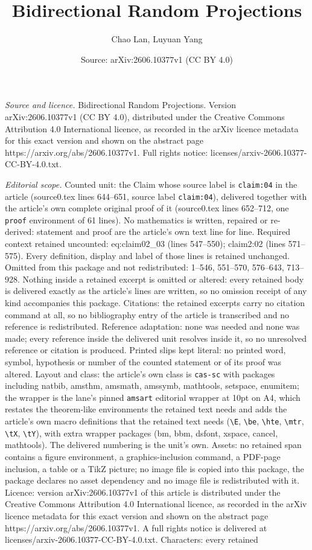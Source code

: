 \documentclass[10pt,a4paper]{amsart}
\title[Bidirectional Random Projections]{Bidirectional Random Projections}
\author{Chao Lan, Luyuan Yang}
\date{Source: arXiv:2606.10377v1 (CC BY 4.0)}
\begin{document}
\maketitle

\noindent\emph{Source and licence.} Bidirectional Random Projections. Version arXiv:2606.10377v1 (CC BY 4.0), distributed under the Creative Commons Attribution 4.0 International licence, as recorded in the arXiv licence metadata for this exact version and shown on the abstract page https://arxiv.org/abs/2606.10377v1. Full rights notice: licenses/arxiv-2606.10377-CC-BY-4.0.txt.\par\smallskip

\noindent\textit{Editorial scope.} Counted unit: the Claim whose source label is \texttt{claim:04} in the article (source0.tex lines 644--651, source label \texttt{claim:04}), delivered together with the article's own complete original proof of it (source0.tex lines 652--712, one \texttt{proof} environment of 61 lines). No mathematics is written, repaired or re-derived: statement and proof are the article's own text line for line. Required context retained uncounted: eq:claim02\_03 (lines 547--550); claim2:02 (lines 571--575). Every definition, display and label of those lines is retained unchanged. Omitted from this package and not redistributed: 1--546, 551--570, 576--643, 713--928. Nothing inside a retained excerpt is omitted or altered: every retained body is delivered exactly as the article's lines are written, so no omission receipt of any kind accompanies this package. Citations: the retained excerpts carry no citation command at all, so no bibliography entry of the article is transcribed and no reference is redistributed. Reference adaptation: none was needed and none was made; every reference inside the delivered unit resolves inside it, so no unresolved reference or citation is produced. Printed slips kept literal: no printed word, symbol, hypothesis or number of the counted statement or of its proof was altered. Layout and class: the article's own class is \texttt{cas-sc} with packages including natbib, amsthm, amsmath, amssymb, mathtools, setspace, enumitem; the wrapper is the lane's pinned \texttt{amsart} editorial wrapper at 10pt on A4, which restates the theorem-like environments the retained text needs and adds the article's own macro definitions that the retained text needs (\texttt{\textbackslash E}, \texttt{\textbackslash be}, \texttt{\textbackslash hte}, \texttt{\textbackslash mtr}, \texttt{\textbackslash tX}, \texttt{\textbackslash tY}), with extra wrapper packages (bm, bbm, dsfont, xspace, cancel, mathtools). The delivered numbering is the unit's own. Assets: no retained span contains a figure environment, a graphics-inclusion command, a PDF-page inclusion, a table or a TikZ picture; no image file is copied into this package, the package declares no asset dependency and no image file is redistributed with it. Licence: version arXiv:2606.10377v1 of this article is distributed under the Creative Commons Attribution 4.0 International licence, as recorded in the arXiv licence metadata for this exact version and shown on the abstract page https://arxiv.org/abs/2606.10377v1. A full rights notice is delivered at licenses/arxiv-2606.10377-CC-BY-4.0.txt. Characters: every retained 
\end{document}
